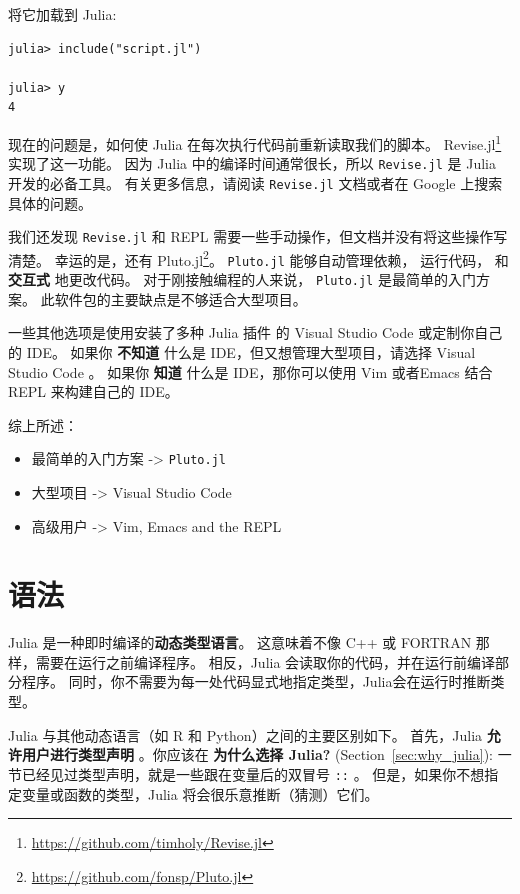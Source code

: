 \documentclass[
  notoc %
]{tufte-book}
\DeclareRobustCommand{\href}[2]{#2\footnote{\url{#1}}}
\providecommand{\tightlist}{%
  \setlength{\itemsep}{0pt}\setlength{\parskip}{0pt}
}
\newcommand{\passthrough}[1]{#1}
\begin{document}
将它加载到 Julia:

\begin{lstlisting}
julia> include("script.jl")

julia> y
4
\end{lstlisting}

现在的问题是，如何使 Julia 在每次执行代码前重新读取我们的脚本。
\href{https://github.com/timholy/Revise.jl}{Revise.jl} 实现了这一功能。
因为 Julia 中的编译时间通常很长，所以
\passthrough{\lstinline!Revise.jl!} 是 Julia 开发的必备工具。
有关更多信息，请阅读 \passthrough{\lstinline!Revise.jl!} 文档或者在
Google 上搜索具体的问题。

我们还发现 \passthrough{\lstinline!Revise.jl!} 和 REPL
需要一些手动操作，但文档并没有将这些操作写清楚。 幸运的是，还有
\href{https://github.com/fonsp/Pluto.jl}{Pluto.jl}。
\passthrough{\lstinline!Pluto.jl!} 能够自动管理依赖， 运行代码， 和
\textbf{交互式} 地更改代码。 对于刚接触编程的人来说，
\passthrough{\lstinline!Pluto.jl!} 是最简单的入门方案。
此软件包的主要缺点是不够适合大型项目。

一些其他选项是使用安装了多种 Julia 插件 的 Visual Studio Code
或定制你自己的 IDE。 如果你 \textbf{不知道} 什么是
IDE，但又想管理大型项目，请选择 Visual Studio Code 。 如果你
\textbf{知道} 什么是 IDE，那你可以使用 Vim 或者Emacs 结合 REPL
来构建自己的 IDE。

综上所述：

\begin{itemize}
\tightlist
\item
  最简单的入门方案 -\textgreater{} \passthrough{\lstinline!Pluto.jl!}
\item
  大型项目 -\textgreater{} Visual Studio Code
\item
  高级用户 -\textgreater{} Vim, Emacs and the REPL
\end{itemize}

\hypertarget{sec:syntax}{%
\section{语法}\label{sec:syntax}}

Julia 是一种即时编译的\textbf{动态类型语言}。 这意味着不像 C++ 或
FORTRAN 那样，需要在运行之前编译程序。 相反，Julia
会读取你的代码，并在运行前编译部分程序。
同时，你不需要为每一处代码显式地指定类型，Julia会在运行时推断类型。

Julia 与其他动态语言（如 R 和 Python）之间的主要区别如下。 首先，Julia
\textbf{允许用户进行类型声明} 。你应该在 \textbf{为什么选择 Julia?}
(Section~\ref{sec:why_julia}):
一节已经见过类型声明，就是一些跟在变量后的双冒号
\passthrough{\lstinline!::!} 。
但是，如果你不想指定变量或函数的类型，Julia 将会很乐意推断（猜测）它们。
\end{document}
